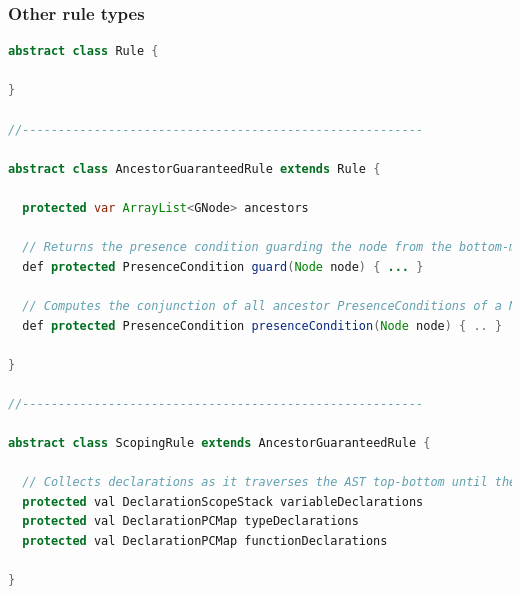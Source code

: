 \documentclass{beamer}
\begin{document}
\begin{frame}[fragile]
\frametitle{Other rule types}

\begin{lstlisting}[language=java]
abstract class Rule {

}

//--------------------------------------------------------

abstract class AncestorGuaranteedRule extends Rule {

  protected var ArrayList<GNode> ancestors
  
  // Returns the presence condition guarding the node from the bottom-most Conditional ancestor.
  def protected PresenceCondition guard(Node node) { ... }
  
  // Computes the conjunction of all ancestor PresenceConditions of a Node.
  def protected PresenceCondition presenceCondition(Node node) { .. }

}

//--------------------------------------------------------

abstract class ScopingRule extends AncestorGuaranteedRule {

  // Collects declarations as it traverses the AST top-bottom until the place where it can be applied.
  protected val DeclarationScopeStack variableDeclarations
  protected val DeclarationPCMap typeDeclarations
  protected val DeclarationPCMap functionDeclarations

}
\end{lstlisting}

\end{frame}
\end{document}
